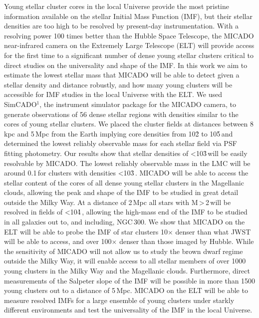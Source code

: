 % 

\abstract
{Young stellar cluster cores in the local Universe provide the most pristine information available on the stellar Initial Mass Function (IMF), but their stellar densities are too high to be resolved by present-day instrumentation. With a resolving power 100 times better than the Hubble Space Telescope, the MICADO near-infrared camera on the Extremely Large Telescope (ELT) will provide access for the first time to a significant number of dense young stellar clusters critical to direct studies on the universality and shape of the IMF.}
{In this work we aim to estimate the lowest stellar mass that MICADO will be able to detect given a stellar density and distance robustly, and how many young clusters will be accessible for IMF studies in the local Universe with the ELT.}
{We used SimCADO$^1$, the instrument simulator package for the MICADO camera, to generate observations of 56 dense stellar regions with densities similar to the cores of young stellar clusters. We placed the cluster fields at distances between 8\,kpc and 5\,Mpc from the Earth implying core densities from 10\h2 to 10\h5\,\spa and determined the lowest reliably observable mass for each stellar field via PSF fitting photometry.}
{Our results show that stellar densities of \textless10\h3\,\spa will be easily resolvable by MICADO. The lowest reliably observable mass in the LMC will be around 0.1\,\msun for clusters with densities \textless10\h3\,\spa. MICADO will be able to access the stellar content of the cores of all dense young stellar clusters in the Magellanic clouds, allowing the peak and shape of the IMF to be studied in great detail outside the Milky Way. At a distance of 2\,Mpc all stars with M\,\textgreater\,2\,\msun will be resolved in fields of \textless10\h4\,\spa, allowing the high-mass end of the IMF to be studied in all galaxies out to, and including, NGC\,300.}
{We show that MICADO on the ELT will be able to probe the IMF of star clusters 10$\times$ denser than what JWST will be able to access, and over 100$\times$ denser than those imaged by Hubble. While the sensitivity of MICADO will not allow us to study the brown dwarf regime outside the Milky Way, it will enable access to all stellar members of over 1000 young clusters in the Milky Way and the Magellanic clouds. Furthermore, direct measurements of the Salpeter slope of the IMF will be possible in more than 1500 young clusters out to a distance of 5\,Mpc. MICADO on the ELT will be able to measure resolved IMFs for a large ensemble of young clusters under starkly different environments and test the universality of the IMF in the local Universe.}



